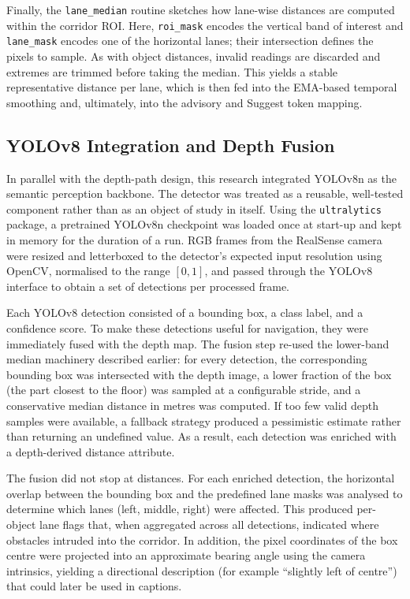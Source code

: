 \documentclass[11pt,a4paper]{article}
\newcommand{\code}[1]{\texttt{#1}}
\begin{document}
Finally, the \code{lane\_median} routine sketches how lane-wise distances are computed within the corridor ROI. Here, \code{roi\_mask} encodes the vertical band of interest and \code{lane\_mask} encodes one of the horizontal lanes; their intersection defines the pixels to sample. As with object distances, invalid readings are discarded and extremes are trimmed before taking the median. This yields a stable representative distance per lane, which is then fed into the EMA-based temporal smoothing and, ultimately, into the advisory and Suggest token mapping.

\subsection{YOLOv8 Integration and Depth Fusion}

In parallel with the depth-path design, this research integrated YOLOv8n as the semantic perception backbone. The detector was treated as a reusable, well-tested component rather than as an object of study in itself. Using the \code{ultralytics} package, a pretrained YOLOv8n checkpoint was loaded once at start-up and kept in memory for the duration of a run. RGB frames from the RealSense camera were resized and letterboxed to the detector's expected input resolution using OpenCV, normalised to the range $[0,1]$, and passed through the YOLOv8 interface to obtain a set of detections per processed frame.

Each YOLOv8 detection consisted of a bounding box, a class label, and a confidence score. To make these detections useful for navigation, they were immediately fused with the depth map. The fusion step re-used the lower-band median machinery described earlier: for every detection, the corresponding bounding box was intersected with the depth image, a lower fraction of the box (the part closest to the floor) was sampled at a configurable stride, and a conservative median distance in metres was computed. If too few valid depth samples were available, a fallback strategy produced a pessimistic estimate rather than returning an undefined value. As a result, each detection was enriched with a depth-derived distance attribute.

The fusion did not stop at distances. For each enriched detection, the horizontal overlap between the bounding box and the predefined lane masks was analysed to determine which lanes (left, middle, right) were affected. This produced per-object lane flags that, when aggregated across all detections, indicated where obstacles intruded into the corridor. In addition, the pixel coordinates of the box centre were projected into an approximate bearing angle using the camera intrinsics, yielding a directional description (for example ``slightly left of centre'') that could later be used in captions.
\end{document}

